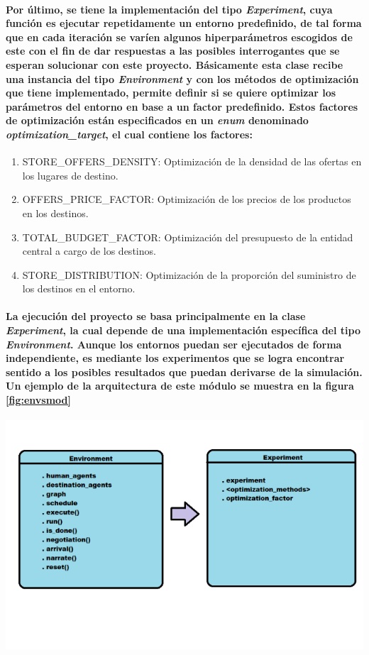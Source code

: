 \documentclass[12pt]{amsart}
\begin{document}
\paragraph{Por último, se tiene la implementación del tipo \textit{Experiment}, cuya función es ejecutar repetidamente un entorno predefinido, de tal forma que en cada iteración se varíen algunos hiperparámetros escogidos de este con el fin de dar respuestas a las posibles interrogantes que se esperan solucionar con este proyecto. Básicamente esta clase recibe una instancia del tipo \textit{Environment} y con los métodos de optimización que tiene implementado, permite definir si se quiere optimizar los parámetros del entorno en base a un factor predefinido. Estos factores de optimización están especificados en un \textit{enum} denominado \textit{optimization\_target}, el cual contiene los factores:} \label{par:exp}
\begin {enumerate}
				\item {STORE\_OFFERS\_DENSITY: Optimización de la densidad de las ofertas en los lugares de destino.}
				\item {OFFERS\_PRICE\_FACTOR: Optimización de los precios de los productos en los destinos.}
				\item {TOTAL\_BUDGET\_FACTOR: Optimización del presupuesto de la entidad central a cargo de los destinos.}
				\item {STORE\_DISTRIBUTION: Optimización de la proporción del suministro de los destinos en el entorno.}
\end {enumerate}

\paragraph{La ejecución del proyecto se basa principalmente en la clase \textit{Experiment}, la cual depende de una implementación específica del tipo \textit{Environment}. Aunque los entornos puedan ser ejecutados de forma independiente, es mediante los experimentos que se logra encontrar sentido a los posibles resultados que puedan derivarse de la simulación. Un ejemplo de la arquitectura de este módulo se muestra en la figura \ref{fig:envsmod}}

\begin{center}
	\includegraphics[scale=0.8]{./images/envsmod.png}
	\label{fig:envsmod}
\end{center}
\end{document}
